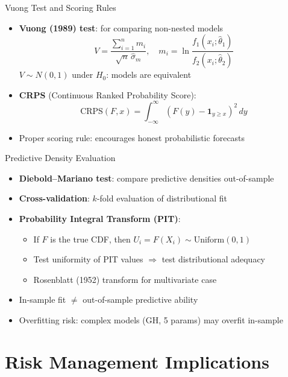 \documentclass[9pt, aspectratio=169, t]{beamer}
\theoremstyle{definition}
\begin{document}
\begin{frame}{Vuong Test and Scoring Rules}
\begin{itemize}
\item \textbf{Vuong (1989) test}: for comparing non-nested models
\[
V = \frac{\sum_{i=1}^n m_i}{\sqrt{n}\,\hat{\sigma}_m}, \quad m_i = \ln\frac{f_1(x_i;\hat{\theta}_1)}{f_2(x_i;\hat{\theta}_2)}
\]
$V \sim N(0,1)$ under $H_0$: models are equivalent
\item \textbf{CRPS} (Continuous Ranked Probability Score):
\[
\text{CRPS}(F, x) = \int_{-\infty}^{\infty} (F(y) - \mathbf{1}_{y \geq x})^2\,dy
\]
\item Proper scoring rule: encourages honest probabilistic forecasts
\end{itemize}
\end{frame}

\begin{frame}{Predictive Density Evaluation}
\begin{itemize}
\item \textbf{Diebold--Mariano test}: compare predictive densities out-of-sample
\item \textbf{Cross-validation}: $k$-fold evaluation of distributional fit
\item \textbf{Probability Integral Transform (PIT)}:
\begin{itemize}
\item If $F$ is the true CDF, then $U_i = F(X_i) \sim \text{Uniform}(0,1)$
\item Test uniformity of PIT values $\Rightarrow$ test distributional adequacy
\item Rosenblatt (1952) transform for multivariate case
\end{itemize}
\item In-sample fit $\neq$ out-of-sample predictive ability
\item Overfitting risk: complex models (GH, 5 params) may overfit in-sample
\end{itemize}
\end{frame}

\section{Risk Management Implications}
\end{document}
